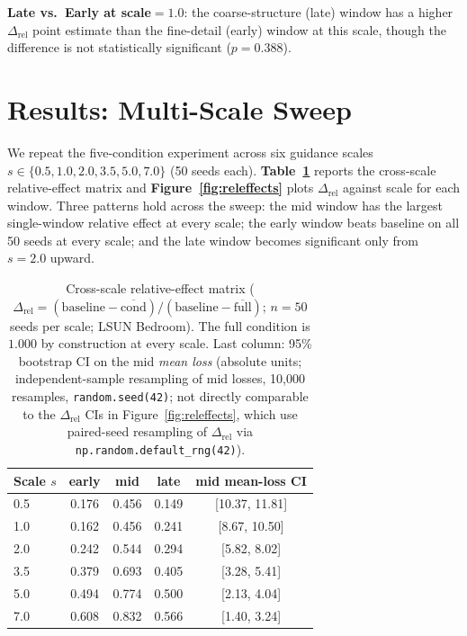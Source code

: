 \documentclass[10pt]{article}
\begin{document}
\medskip

\noindent\textbf{Late vs.\ Early at scale$=1.0$}: the coarse-structure (late)
window has a higher $\Delta_\mathrm{rel}$ point estimate than the fine-detail
(early) window at this scale, though the difference is not statistically
significant ($p = 0.388$).

\section{Results: Multi-Scale Sweep}
\label{sec:sweep}

We repeat the five-condition experiment across six guidance scales
$s\in\{0.5,1.0,2.0,3.5,5.0,7.0\}$ (50 seeds each).
\textbf{Table~\ref{tab:crossscale}} reports the cross-scale relative-effect
matrix and \textbf{Figure~\ref{fig:releffects}} plots $\Delta_\mathrm{rel}$
against scale for each window.  Three patterns hold across the sweep: the mid
window has the largest single-window relative effect at every scale; the early
window beats baseline on all 50 seeds at every scale; and the late window
becomes significant only from $s=2.0$ upward.

\begin{table}[h]
\centering
\caption{Cross-scale relative-effect matrix
($\Delta_\mathrm{rel} = (\text{baseline}-\overline{\text{cond}})/
(\text{baseline}-\overline{\text{full}})$; $n=50$ seeds per scale; LSUN
Bedroom).  The full condition is $1.000$ by construction at every scale.
Last column: 95\% bootstrap CI on the mid \emph{mean loss} (absolute units;
independent-sample resampling of mid losses, 10{,}000 resamples, \texttt{random.seed(42)};
not directly comparable to the $\Delta_\mathrm{rel}$ CIs in Figure~\ref{fig:releffects},
which use paired-seed resampling of $\Delta_\mathrm{rel}$ via \texttt{np.random.default\_rng(42)}).}
\label{tab:crossscale}
\renewcommand{\arraystretch}{1.1}
\begin{tabular}{@{}lcccc@{}}
\toprule
\textbf{Scale $s$} & \textbf{early} & \textbf{mid} & \textbf{late} &
  \textbf{mid mean-loss CI} \\
\midrule
0.5 & 0.176 & 0.456 & 0.149 & [10.37, 11.81] \\
1.0 & 0.162 & 0.456 & 0.241 & [8.67, 10.50] \\
2.0 & 0.242 & 0.544 & 0.294 & [5.82, 8.02] \\
3.5 & 0.379 & 0.693 & 0.405 & [3.28, 5.41] \\
5.0 & 0.494 & 0.774 & 0.500 & [2.13, 4.04] \\
7.0 & 0.608 & 0.832 & 0.566 & [1.40, 3.24] \\
\bottomrule
\end{tabular}
\end{table}
\end{document}
